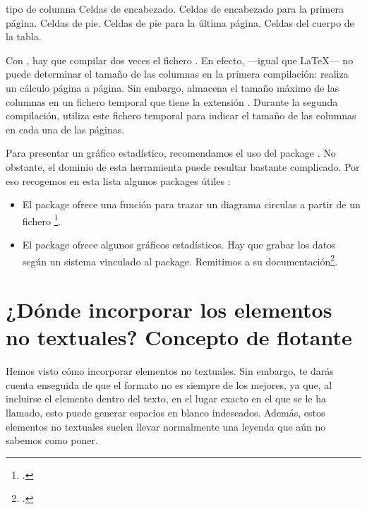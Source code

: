 \begin{latexcode}
\begin{longtable}{tipo de columna}
Celdas de encabezado.
\endhead
Celdas de encabezado para la primera página.
\endfirsthead
Celdas de pie.
\endfoot
Celdas de pie para la última página.
\endlastfoot
Celdas del cuerpo de la tabla.
\end{longtable}
\end{latexcode}

\begin{attention}
Con , hay que compilar dos veces el fichero . 
En efecto, \XeLaTeX{} ---igual que \LaTeX{}--- no puede determinar el tamaño de las columnas en la primera compilación: realiza un cálculo página a página. Sin embargo, almacena el tamaño máximo de las columnas en un fichero temporal que tiene la extensión . Durante la segunda compilación, utiliza este fichero temporal para indicar el tamaño de las columnas en cada una de las páginas.
\end{attention}
 
\begin{plusloins}
Para presentar un gráfico estadístico, recomendamos el uso del package . No obstante, el dominio de esta herramienta puede resultar bastante complicado. Por eso recogemos en esta lista algunos packages útiles : 
\begin{itemize}
\item El package  ofrece una función para trazar un diagrama circulas a partir de un fichero \footcite[Su documentación se encuentra en la del package :][]{csvtools_pie}. 
\item El package  ofrece algunos gráficos estadísticos. Hay que grabar los datos según un sistema vinculado al  package. Remitimos a su documentación\footcite{datatool}.
\end{itemize}
\end{plusloins}


\section[El concepto de flotante]{¿Dónde incorporar los elementos no textuales?  Concepto de flotante}
\label{legende}
Hemos visto cómo incorporar elementos no textuales. Sin embargo, te darás cuenta enseguida de que el formato no es siempre de los mejores, ya que, al incluirse el elemento dentro del texto, en el lugar exacto en el que se le ha llamado, esto puede generar espacios en blanco indeseados. Además, estos elementos no textuales suelen llevar normalmente una leyenda que aún no sabemos como poner.

